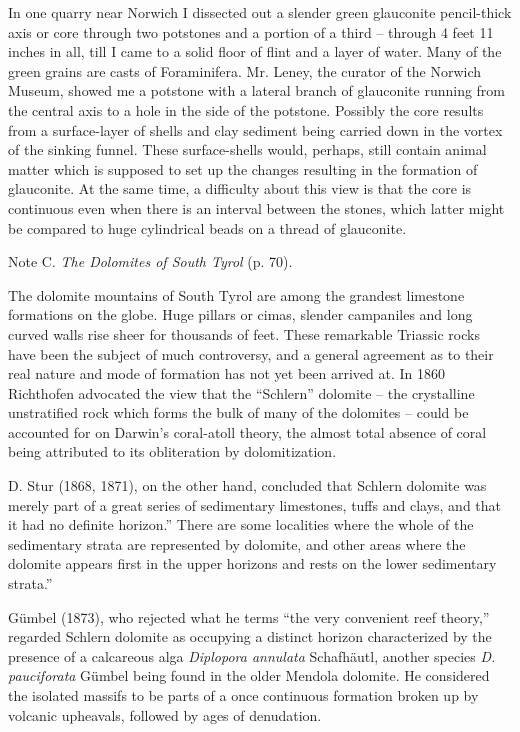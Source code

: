 \documentclass[a4paper, 12pt, oneside]{article}
\begin{document}
In one quarry near Norwich I dissected out a slender green glauconite pencil-thick axis or core through two potstones and a portion of a third -- through 4 feet 11 inches in all, till I came to a solid floor of flint and a layer of water. Many of the green grains are casts of Foraminifera. Mr. Leney, the curator of the Norwich Museum, showed me a potstone with a lateral branch of glauconite running from the central axis to a hole in the side of the potstone. Possibly the core results from a surface-layer of shells and clay sediment being carried down in the vortex of the sinking funnel. These surface-shells would, perhaps, still contain animal matter which is supposed to set up the changes resulting in the formation of glauconite. At the same time, a difficulty about this view is that the core is continuous even when there is an interval between the stones, which latter might be compared to huge cylindrical beads on a thread of glauconite.

Note C. \emph{The Dolomites of South Tyrol} (p. 70).

The dolomite mountains of South Tyrol are among the grandest limestone formations on the globe. Huge pillars or cimas, slender campaniles and long curved walls rise sheer for thousands of feet. These remarkable Triassic rocks have been the subject of much controversy, and a general agreement as to their real nature and mode of formation has not yet been arrived at. In 1860 Richthofen advocated the view that the ``Schlern'' dolomite -- the crystalline unstratified rock which forms the bulk of many of the dolomites -- could be accounted for on Darwin's coral-atoll theory, the almost total absence of coral being attributed to its obliteration by dolomitization.

D. Stur (1868, 1871), on the other hand, concluded that Schlern dolomite was merely part of a great series of sedimentary limestones, tuffs and clays, and that it had no definite horizon.'' There are some localities where the whole of the sedimentary strata are represented by dolomite, and other areas where the dolomite appears first in the upper horizons and rests on the lower sedimentary strata.''

Gümbel (1873), who rejected what he terms ``the very convenient reef theory,'' regarded Schlern dolomite as occupying a distinct horizon characterized by the presence of a calcareous alga \emph{Diplopora annulata} Schafhäutl, another species \emph{D. pauciforata} Gümbel being found in the older Mendola dolomite. He considered the isolated massifs to be parts of a once continuous formation broken up by volcanic upheavals, followed by ages of denudation.
\end{document}
